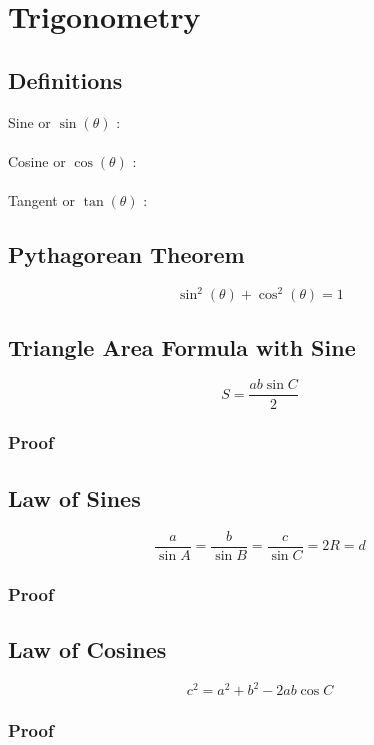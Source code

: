 \documentclass{article}
\begin{document}
\pagebreak

\section{Trigonometry}

\subsection{Definitions}

Sine or $\sin(\theta)$ :
\\ \\
Cosine or $\cos(\theta)$ :
\\ \\
Tangent or $\tan(\theta)$ :

\subsection{Pythagorean Theorem}
$$\sin^2 (\theta)+\cos^2 (\theta)=1$$

\subsection{Triangle Area Formula with Sine}

$$S=\frac{ab\sin C}{2}$$

\subsubsection{Proof}
\vspace{40px}


\subsection{Law of Sines}

$$\frac{a}{\sin A}=\frac{b}{\sin B}=\frac{c}{\sin C}=2R=d$$

\subsubsection{Proof}
\vspace{100px}

\subsection{Law of Cosines}
$$c^2=a^2+b^2-2 a b \cos C $$

\subsubsection{Proof}
\end{document}
